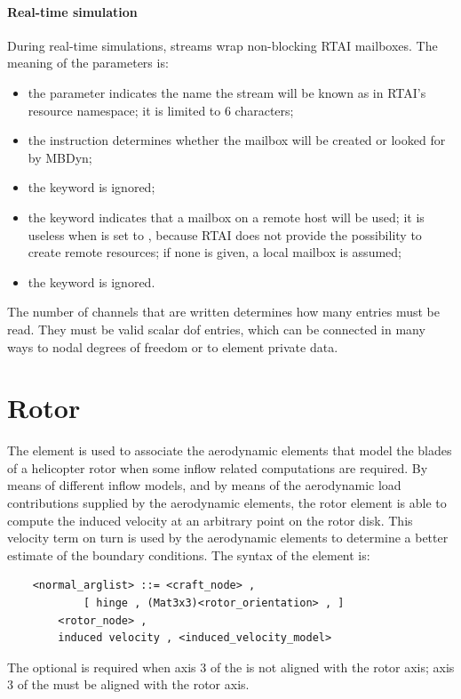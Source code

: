 \paragraph{Real-time simulation}
During real-time simulations, streams wrap non-blocking RTAI mailboxes.
The meaning of the parameters is:
\begin{itemize}
\item the parameter  indicates the name the stream
will be known as in RTAI's resource namespace; it is limited to 6 characters;
\item the instruction  determines whether the mailbox will be
created or looked for by MBDyn;
\item the keyword  is ignored;
\item the keyword  indicates that a mailbox on a remote host 
will be used; it is useless when  is set to , because
RTAI does not provide the possibility to create remote resources;
if none is given, a local mailbox is assumed;
\item the keyword  is ignored.
\end{itemize}

The number of channels  that are written
determines how many  entries must be read.
They must be valid scalar dof entries, which can be connected
in many ways to nodal degrees of freedom or to element private data.






\section{Rotor}
The  element is used to associate the aerodynamic elements that
model the blades of a helicopter rotor when some inflow related computations 
are required.
By means of different inflow models, and by means of the
aerodynamic load contributions supplied by the aerodynamic elements, the
rotor element is able to compute the induced velocity at an arbitrary point on
the rotor disk. This velocity term on turn is used by the aerodynamic
elements to determine a better estimate of the boundary conditions.
The syntax of the  element is:
\begin{verbatim}
    <normal_arglist> ::= <craft_node> ,
            [ hinge , (Mat3x3)<rotor_orientation> , ]
        <rotor_node> ,
        induced velocity , <induced_velocity_model>
\end{verbatim}
The optional  is required when axis 3 
of the  is not aligned with the rotor axis; axis 3
of the  must be aligned with the rotor axis.

